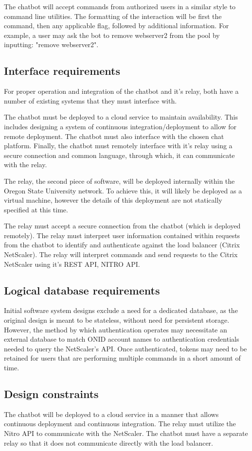 \documentclass[onecolumn, draftclsnofoot,10pt, compsoc]{IEEEtran}
\begin{document}
The chatbot will accept commands from authorized users in a similar style to command line utilities.
The formatting of the interaction will be first the command, then any applicable flag, followed by additional information.
For example, a user may ask the bot to remove webserver2 from the pool by inputting: "remove webserver2".

\subsection{Interface requirements}
For proper operation and integration of the chatbot and it's relay, both have a number of existing systems that they must interface with.

The chatbot must be deployed to a cloud service to maintain availability. 
This includes designing a system of continuous integration/deployment to allow for remote deployment.
The chatbot must also interface with the chosen chat platform.
Finally, the chatbot must remotely interface with it's relay using a secure connection and common language, through which, it can communicate with the relay.

The relay, the second piece of software, will be deployed internally within the Oregon State University network.
To achieve this, it will likely be deployed as a virtual machine, however the details of this deployment are not statically specified at this time.

The relay must accept a secure connection from the chatbot (which is deployed remotely).
The relay must interpret user information contained within requests from the chatbot to identify and authenticate against the load balancer (Citrix NetScaler).
The relay will interpret commands and send requests to the Citrix NetScaler using it's REST API, NITRO API.

\subsection{Logical database requirements}
Initial software system designs exclude a need for a dedicated database, as the original design is meant to be stateless, without need for persistent storage.
However, the method by which authentication operates may necessitate an external database to match ONID account names to authentication credentials needed to query the NetScaler's API.
Once authenticated, tokens may need to be retained for users that are performing multiple commands in a short amount of time.

\subsection{Design constraints}
The chatbot will be deployed to a cloud service in a manner that allows continuous deployment and continuous integration. 
The relay must utilize the Nitro API to communicate with the NetScaler. 
The chatbot must have a separate relay so that it does not communicate directly with the load balancer.
\end{document}
